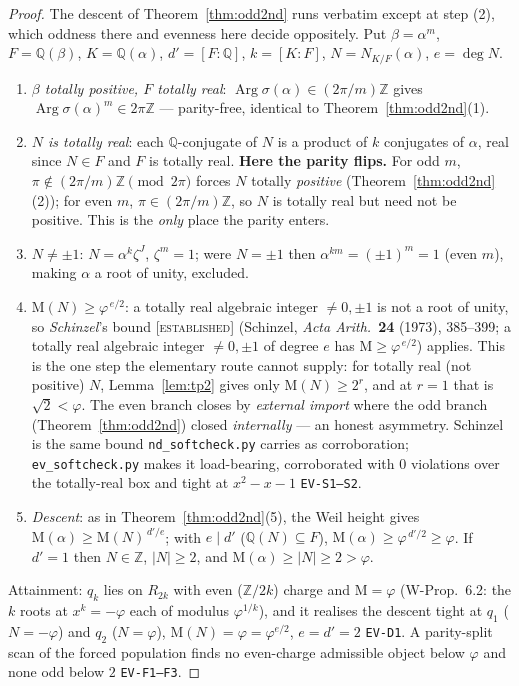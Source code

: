 \documentclass[11pt]{article}
\newcommand{\tagE}{\textcolor{cE}{\textsc{[established]}}}
\newcommand{\hx}[1]{\textcolor{cC}{\footnotesize\texttt{#1}}}
\newcommand{\Q}{\mathbb{Q}}
\newcommand{\Z}{\mathbb{Z}}
\newcommand{\gp}{\varphi}
\newcommand{\M}{\mathrm{M}}
\DeclareMathOperator{\Arg}{Arg}
\theoremstyle{plain}
\theoremstyle{definition}
\theoremstyle{remark}
\begin{document}
\begin{proof}
The descent of Theorem~\ref{thm:odd2nd} runs verbatim except at step (2), which
oddness there and evenness here decide oppositely. Put $\beta=\alpha^m$,
$F=\Q(\beta)$, $K=\Q(\alpha)$, $d'=[F:\Q]$, $k=[K:F]$, $N=N_{K/F}(\alpha)$,
$e=\deg N$.
\begin{enumerate}[nosep,label=(\arabic*),leftmargin=2.2em]
\item \emph{$\beta$ totally positive, $F$ totally real}: $\Arg\sigma(\alpha)
\in(2\pi/m)\Z$ gives $\Arg\sigma(\alpha)^m\in2\pi\Z$ --- parity-free, identical to
Theorem~\ref{thm:odd2nd}(1).
\item \emph{$N$ is totally real}: each $\Q$-conjugate of $N$ is a product of $k$
conjugates of $\alpha$, real since $N\in F$ and $F$ is totally real. \textbf{Here
the parity flips.} For odd $m$, $\pi\notin(2\pi/m)\Z\pmod{2\pi}$ forces $N$
totally \emph{positive} (Theorem~\ref{thm:odd2nd}(2)); for even $m$,
$\pi\in(2\pi/m)\Z$, so $N$ is totally real but need not be positive. This is the
\emph{only} place the parity enters.
\item \emph{$N\neq\pm1$}: $N=\alpha^k\zeta^J$, $\zeta^m=1$; were $N=\pm1$ then
$\alpha^{km}=(\pm1)^m=1$ (even $m$), making $\alpha$ a root of unity, excluded.
\item \emph{$\M(N)\ge\gp^{\,e/2}$}: a totally real algebraic integer $\ne0,\pm1$
is not a root of unity, so \emph{Schinzel}'s bound \tagE{} (Schinzel,
\emph{Acta Arith.}~\textbf{24} (1973), 385--399; a totally real algebraic integer
$\ne0,\pm1$ of degree $e$ has $\M\ge\gp^{\,e/2}$) applies. This is the one step the elementary route cannot supply: for totally
real (not positive) $N$, Lemma~\ref{lem:tp2} gives only $\M(N)\ge2^{r}$, and at
$r=1$ that is $\sqrt2<\gp$. The even branch closes by \emph{external import} where
the odd branch (Theorem~\ref{thm:odd2nd}) closed \emph{internally} --- an honest
asymmetry. Schinzel is the same bound \texttt{nd\_softcheck.py} carries as
corroboration; \texttt{ev\_softcheck.py} makes it load-bearing, corroborated with
$0$ violations over the totally-real box and tight at $x^2-x-1$ \hx{EV-S1--S2}.
\item \emph{Descent}: as in Theorem~\ref{thm:odd2nd}(5), the Weil height gives
$\M(\alpha)\ge\M(N)^{\,d'/e}$; with $e\mid d'$ ($\Q(N)\subseteq F$),
$\M(\alpha)\ge\gp^{\,d'/2}\ge\gp$. If $d'=1$ then $N\in\Z$, $|N|\ge2$, and
$\M(\alpha)\ge|N|\ge2>\gp$.
\end{enumerate}
Attainment: $q_k$ lies on $R_{2k}$ with even ($\Z/2k$) charge and $\M=\gp$ (W-Prop.\
6.2: the $k$ roots at $x^k=-\gp$ each of modulus $\gp^{1/k}$), and it realises the
descent tight at $q_1$ ($N=-\gp$) and $q_2$ ($N=\gp$), $\M(N)=\gp=\gp^{e/2}$,
$e=d'=2$ \hx{EV-D1}. A parity-split scan of the forced population finds no
even-charge admissible object below $\gp$ and none odd below $2$ \hx{EV-F1--F3}.
\end{proof}
\end{document}
